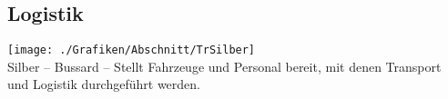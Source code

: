 \subsection{Logistik}
\texttt{[image: ./Grafiken/Abschnitt/TrSilber]}\\
Silber -- Bussard -- Stellt Fahrzeuge und Personal bereit, mit denen Transport und Logistik durchgeführt werden. \\